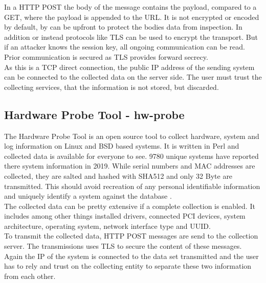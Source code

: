         In a HTTP POST the body of the message contains the payload, compared to a GET, where the payload is appended to the URL.
        It is not encrypted or encoded by default, by can be upfront to protect the bodies data from inspection. In addition or instead protocols like TLS can be used to encrypt the transport. But if an attacker knows the session key, all ongoing communication can be read. Prior communication is secured as TLS provides forward secrecy\cite{}.\\
        
        As this is a TCP direct connection, the public IP address of the sending system can be connected to the collected data on the server side.
        The user must trust the collecting services, that the information is not stored, but discarded.\\
        
    \subsection{Hardware Probe Tool - hw-probe}
        The Hardware Probe Tool is an open source tool to collect hardware, system and log information on Linux and BSD based systems. It is written in Perl and collected data is available for everyone to see. 9780 unique systems have reported there system information in 2019\cite{ponomarenko_linux_nodate}.
        While serial numbers and MAC addresses are collected, they are salted and hashed with SHA512 and only 32 Byte are transmitted. 
        This should avoid recreation of any personal identifiable information and uniquely identify a system against the database \cite{project_linuxhwhw-probe_2020}.\\
        The collected data can be pretty extensive if a complete collection is enabled. It includes among other things installed drivers, connected PCI devices, system architecture, operating system, network interface type and UUID\cite{project_linuxhwhw-probe_2020}.\\
        
        To transmit the collected data, HTTP POST messages are send to the collection server. The transmissions uses TLS to secure the content of these messages\cite{project_linuxhwhw-probe_2020}.\\
        Again the IP of the system is connected to the data set transmitted and the user has to rely and trust on the collecting entity to separate these two information from each other.\\
    


